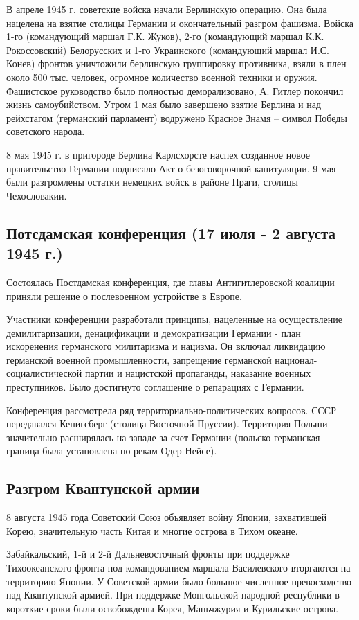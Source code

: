 В апреле 1945 г. советские войска начали Берлинскую операцию.
Она была нацелена на взятие столицы Германии и окончательный разгром фашизма. Войска 1-го (командующий маршал Г.К. Жуков), 2-го (командующий маршал К.К. Рокоссовский) Белорусских и 1-го Украинского (командующий маршал И.С. Конев) фронтов уничтожили берлинскую группировку противника, взяли в плен около 500 тыс. человек,
огромное количество военной техники и оружия. Фашистское руководство было полностью деморализовано, А. Гитлер покончил жизнь самоубийством. Утром 1 мая было завершено взятие Берлина и над рейхстагом (германский парламент) водружено Красное Знамя -- символ Победы советского народа.

8 мая 1945 г. в пригороде Берлина Карлсхорсте наспех созданное новое правительство Германии подписало Акт о безоговорочной капитуляции. 9 мая были разгромлены остатки немецких войск в районе Праги, столицы Чехословакии. 

\subsection{Потсдамская конференция (17 июля - 2 августа 1945 г.)}

Состоялась Постдамская конференция, где главы Антигитлеровской коалиции приняли решение о послевоенном устройстве в Европе.

Участники конференции разработали принципы, нацеленные на осуществление демилитаризации, денацификации и демократизации Германии - план искоренения германского милитаризма и нацизма. Он включал ликвидацию германской военной промышленности, запрещение германской национал-социалистической партии и нацистской пропаганды, наказание военных преступников. Было достигнуто соглашение о репарациях с Германии.

Конференция рассмотрела ряд территориально-политических вопросов. СССР передавался Кенигсберг (столица Восточной Пруссии). Территория Польши значительно расширялась на западе за счет Германии (польско-германская граница была установлена по рекам Одер-Нейсе). 

\subsection{Разгром Квантунской армии}

8 августа 1945 года Советский Союз объявляет войну Японии, захватившей Корею, значительную часть Китая и многие острова в Тихом океане.

Забайкальский, 1-й и 2-й Дальневосточный фронты при поддержке Тихоокеанского фронта под командованием маршала Василевского вторгаются на территорию Японии. У Советской армии было большое численное превосходство над Квантунской армией. При поддержке Монгольской народной республики в короткие сроки были освобождены Корея, Маньчжурия и Курильские острова.

